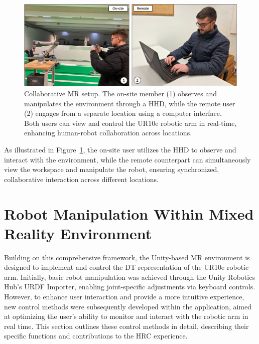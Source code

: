 \begin{figure}[h]
    \centering
    \includegraphics[width=\linewidth]{figs/mr-collab.png}
    \caption{Collaborative \ac{MR} setup. The on-site member (1) observes and manipulates the environment through a \ac{HHD}, while the remote user (2) engages from a separate location using a computer interface. Both users can view and control the UR10e robotic arm in real-time, enhancing human-robot collaboration across locations.}
    \label{fig:project_framework}
\end{figure}

As illustrated in Figure~\ref{fig:project_framework}, the on-site user utilizes the \ac{HHD} to observe and interact with the environment, while the remote counterpart can simultaneously view the workspace and manipulate the robot, ensuring synchronized, collaborative interaction across different locations.


\section{Robot Manipulation Within Mixed Reality Environment}

Building on this comprehensive framework, the Unity-based \ac{MR} environment is designed to implement and control the \ac{DT} representation of the UR10e robotic arm. Initially, basic robot manipulation was achieved through the Unity Robotics Hub's \ac{URDF} Importer, enabling joint-specific adjustments via keyboard controls. However, to enhance user interaction and provide a more intuitive experience, new control methods were subsequently developed within the application, aimed at optimizing the user’s ability to monitor and interact with the robotic arm in real time. This section outlines these control methods in detail, describing their specific functions and contributions to the \ac{HRC} experience. 

